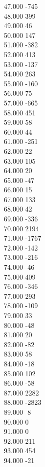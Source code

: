 { 47.000	-745 \\
 48.000	399 \\
 49.000	46 \\
 50.000	147 \\
 51.000	-382 \\
 52.000	413 \\
 53.000	-137 \\
 54.000	263 \\
 55.000	-160 \\
 56.000	75 \\
 57.000	-665 \\
 58.000	451 \\
 59.000	58 \\
 60.000	44 \\
 61.000	-251 \\
 62.000	22 \\
 63.000	105 \\
 64.000	20 \\
 65.000	-47 \\
 66.000	15 \\
 67.000	133 \\
 68.000	42 \\
 69.000	-336 \\
 70.000	2194 \\
 71.000	-1767 \\
 72.000	-142 \\
 73.000	-216 \\
 74.000	-46 \\
 75.000	409 \\
 76.000	-346 \\
 77.000	293 \\
 78.000	-109 \\
 79.000	33 \\
 80.000	-48 \\
 81.000	20 \\
 82.000	-82 \\
 83.000	58 \\
 84.000	-18 \\
 85.000	102 \\
 86.000	-58 \\
 87.000	2282 \\
 88.000	-2823 \\
 89.000	-8 \\
 90.000	0 \\
 91.000	0 \\
 92.000	211 \\
 93.000	454 \\
 94.000	-21 \\
}
